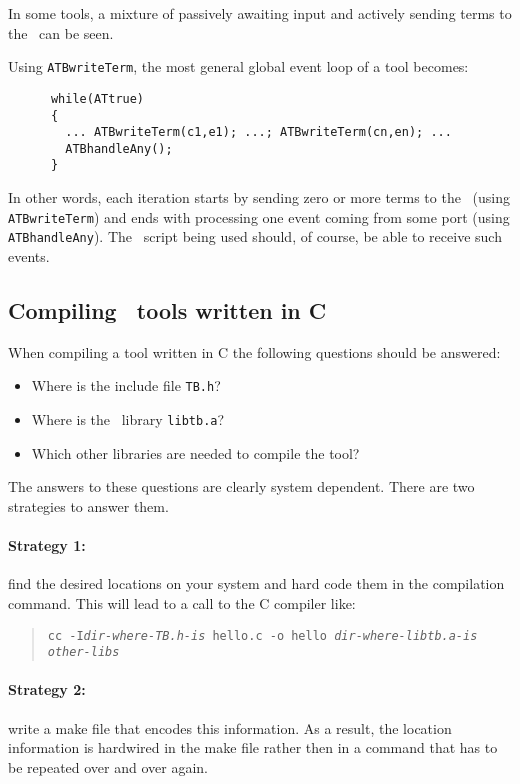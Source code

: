\documentclass[a4,twoside,noweb]{article} %
\begin{document}
In some tools, a mixture of passively awaiting input
and actively sending terms to the \TB\ can be seen.

Using {\tt ATBwriteTerm}, the most general global event loop of a tool becomes:

\begin{verbatim}
      while(ATtrue)
      {
        ... ATBwriteTerm(c1,e1); ...; ATBwriteTerm(cn,en); ...
        ATBhandleAny();
      }
\end{verbatim}

In other words, each iteration starts by sending zero or more terms
to the \TB\ (using {\tt ATBwriteTerm}) and ends with processing one event
coming from some port (using {\tt ATBhandleAny}).  The \T\ script being used
should, of course, be able to receive such events.

\subsection{Compiling \TB\ tools written in C}
When compiling a tool written in C the following questions
should be answered:
\begin{itemize}
\item Where is the include file {\tt TB.h}?
\item Where is the \TB\ library {\tt libtb.a}?
\item Which other libraries are needed to compile the tool?
\end{itemize}

The answers to these questions are clearly system dependent.
There are two strategies to answer them.

\paragraph{Strategy 1:} find the desired locations on your system and hard code them in
the compilation command. This will lead to a call to the C compiler
like:
\begin{quote}
{\tt cc -I{\em dir-where-TB.h-is} hello.c -o hello {\em dir-where-libtb.a-is} {\em other-libs}}
\end{quote}

\paragraph{Strategy 2:}  write a make file that encodes this information.
As a result, the location information is hardwired in the make file
rather then in a command that has to be repeated over and over again.
\end{document}
